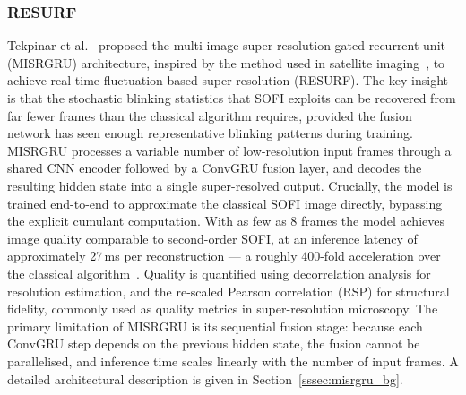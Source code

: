 \subsubsection{RESURF}
Tekpinar et al.~\cite{resurf2024} proposed the multi-image super-resolution gated recurrent unit
(MISRGRU) architecture, inspired by the method used in satellite imaging~\cite{MISRGRU-original},
to achieve real-time fluctuation-based super-resolution (RESURF).
The key insight is that the stochastic blinking statistics that SOFI exploits can be recovered
from far fewer frames than the classical algorithm requires, provided the fusion network has
seen enough representative blinking patterns during training.
MISRGRU processes a variable number of low-resolution input frames through a shared CNN encoder
followed by a ConvGRU fusion layer, and decodes the resulting hidden state into a single
super-resolved output.
Crucially, the model is trained end-to-end to approximate the classical SOFI image directly,
bypassing the explicit cumulant computation.
With as few as 8 frames the model achieves image quality comparable to second-order SOFI,
at an inference latency of approximately 27\,ms per reconstruction --- a roughly 400-fold
acceleration over the classical algorithm~\cite{resurf2024}.
Quality is quantified using decorrelation analysis for resolution estimation, and the re-scaled
Pearson correlation (RSP) for structural fidelity, commonly used as quality metrics in super-resolution 
microscopy.
The primary limitation of MISRGRU is its sequential fusion stage: because each ConvGRU step
depends on the previous hidden state, the fusion cannot be parallelised, and inference time
scales linearly with the number of input frames.
A detailed architectural description is given in Section~\ref{sssec:misrgru_bg}.

